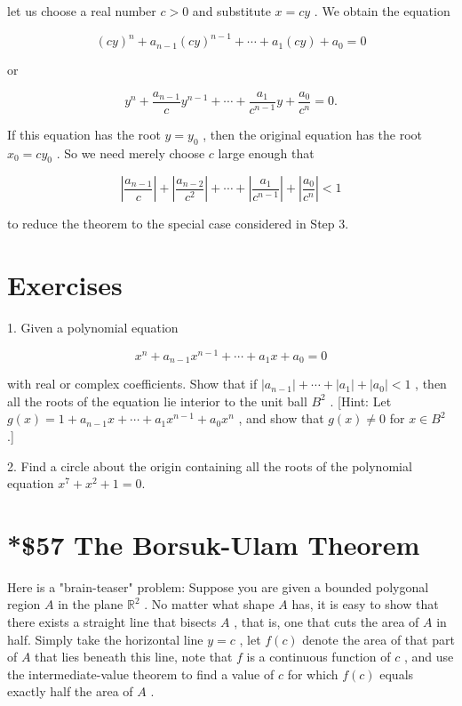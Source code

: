 let us choose a real number \(c > 0\) and substitute \(x = {cy}\) . We obtain the equation

\[
{\left( cy\right) }^{n} + {a}_{n - 1}{\left( cy\right) }^{n - 1} + \cdots  + {a}_{1}\left( {cy}\right)  + {a}_{0} = 0
\]

or

\[
{y}^{n} + \frac{{a}_{n - 1}}{c}{y}^{n - 1} + \cdots  + \frac{{a}_{1}}{{c}^{n - 1}}y + \frac{{a}_{0}}{{c}^{n}} = 0.
\]

If this equation has the root \(y = {y}_{0}\) , then the original equation has the root \({x}_{0} = c{y}_{0}\) . So we need merely choose \(c\) large enough that

\[
\left| \frac{{a}_{n - 1}}{c}\right|  + \left| \frac{{a}_{n - 2}}{{c}^{2}}\right|  + \cdots  + \left| \frac{{a}_{1}}{{c}^{n - 1}}\right|  + \left| \frac{{a}_{0}}{{c}^{n}}\right|  < 1
\]

to reduce the theorem to the special case considered in Step 3.

\section*{Exercises}

1. Given a polynomial equation

\[
{x}^{n} + {a}_{n - 1}{x}^{n - 1} + \cdots  + {a}_{1}x + {a}_{0} = 0
\]

with real or complex coefficients. Show that if \(\left| {a}_{n - 1}\right|  + \cdots  + \left| {a}_{1}\right|  + \left| {a}_{0}\right|  < 1\) , then all the roots of the equation lie interior to the unit ball \({B}^{2}\) . [Hint: Let \(g\left( x\right)  = 1 + {a}_{n - 1}x + \cdots  + {a}_{1}{x}^{n - 1} + {a}_{0}{x}^{n}\) , and show that \(g\left( x\right)  \neq  0\) for \(x \in  {B}^{2}\) .]

2. Find a circle about the origin containing all the roots of the polynomial equation \({x}^{7} + {x}^{2} + 1 = 0.\)

\section*{*\$57 The Borsuk-Ulam Theorem}

Here is a "brain-teaser" problem: Suppose you are given a bounded polygonal region \(A\) in the plane \({\mathbb{R}}^{2}\) . No matter what shape \(A\) has, it is easy to show that there exists a straight line that bisects \(A\) , that is, one that cuts the area of \(A\) in half. Simply take the horizontal line \(y = c\) , let \(f\left( c\right)\) denote the area of that part of \(A\) that lies beneath this line, note that \(f\) is a continuous function of \(c\) , and use the intermediate-value theorem to find a value of \(c\) for which \(f\left( c\right)\) equals exactly half the area of \(A\) .

